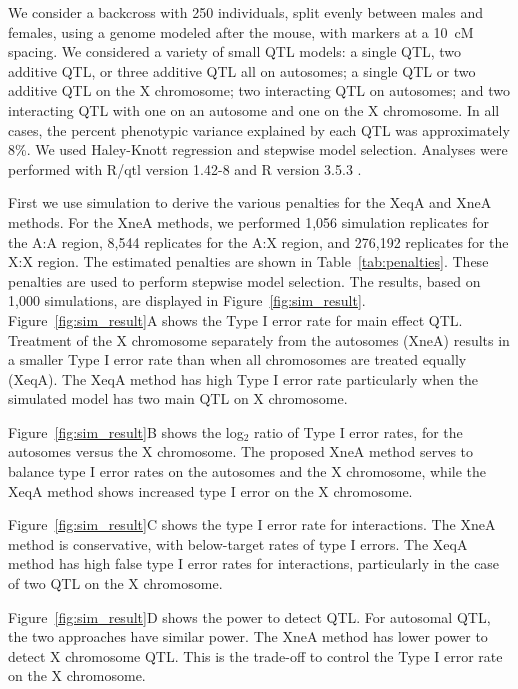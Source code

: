 \documentclass[12pt,letterpaper]{article}
\begin{document}
We consider a backcross with 250 individuals, split evenly between males and females, using a genome modeled
after the mouse, with markers at a 10~cM spacing. We considered a
variety of small QTL models: a single QTL, two additive QTL, or three
additive QTL all on autosomes; a single QTL or two additive QTL on the
X chromosome; two interacting QTL on autosomes; and two interacting
QTL with one on an autosome and one on the X chromosome. In all cases,
the percent phenotypic variance explained by each QTL was
approximately 8\%. We used Haley-Knott regression \citep{Haley1992}
and stepwise model selection. Analyses were performed with R/qtl
version 1.42-8 \citep{Broman2002} and R version 3.5.3 \citep{R}.

First we use simulation to derive the various penalties for the XeqA
and XneA methods. For the XneA methods, we performed 1,056 simulation replicates for the A:A region, 8,544 replicates for the A:X region, and 276,192 replicates for the X:X region. The estimated penalties are shown in Table~\ref{tab:penalties}.
These penalties are used to perform stepwise model selection.
The results, based on 1,000 simulations, are displayed in
Figure~\ref{fig:sim_result}.
Figure~\ref{fig:sim_result}A shows the Type I error rate for main
effect QTL. Treatment of the X chromosome separately from the
autosomes (XneA) results in a smaller Type I error rate than when all
chromosomes are treated equally (XeqA).
The XeqA method has high Type I error rate particularly when  the
simulated model has two main QTL on X chromosome.

Figure~\ref{fig:sim_result}B shows the log$_2$ ratio of Type I error
rates, for the autosomes versus the X chromosome. The proposed XneA
method serves to balance type I error rates on the autosomes and the X
chromosome, while the XeqA method shows increased type I error on the X
chromosome.

Figure~\ref{fig:sim_result}C shows the type I error rate for
interactions. The XneA method is conservative, with below-target rates of
type I errors. The XeqA method has high false type I error rates for interactions,
particularly in the case of two QTL on the X chromosome.

Figure~\ref{fig:sim_result}D shows the power to detect QTL. For
autosomal QTL, the two approaches have similar power. The XneA method
has lower power to detect X chromosome QTL. This is the trade-off to
control the Type I error rate on the X chromosome.
\end{document}
